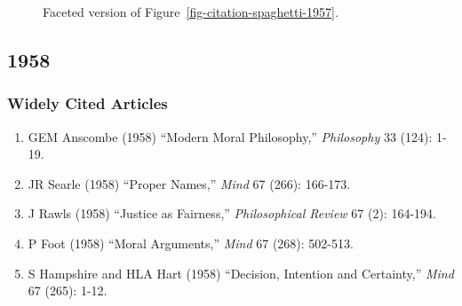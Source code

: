 \documentclass[
  10pt,
  letterpaper,
  DIV=11,
  numbers=noendperiod,
  twoside]{scrartcl}
\providecommand{\tightlist}{%
  \setlength{\itemsep}{0pt}\setlength{\parskip}{0pt}}\usepackage{longtable,booktabs,array}
\begin{document}
\begin{figure}


\caption{\label{fig-citation-facet-1957}Faceted version of
Figure~\ref{fig-citation-spaghetti-1957}.}

\end{figure}%

\newpage

\subsection{1958}\label{sec-s1958}

\subsubsection*{Widely Cited Articles}\label{widely-cited-articles-2}

\begin{enumerate}
\def\labelenumi{\arabic{enumi}.}
\tightlist
\item
  GEM Anscombe (1958) ``Modern Moral Philosophy,'' \emph{Philosophy} 33
  (124): 1-19.
\item
  JR Searle (1958) ``Proper Names,'' \emph{Mind} 67 (266): 166-173.
\item
  J Rawls (1958) ``Justice as Fairness,'' \emph{Philosophical Review} 67
  (2): 164-194.
\item
  P Foot (1958) ``Moral Arguments,'' \emph{Mind} 67 (268): 502-513.
\item
  S Hampshire and HLA Hart (1958) ``Decision, Intention and Certainty,''
  \emph{Mind} 67 (265): 1-12.
\end{enumerate}
\end{document}
